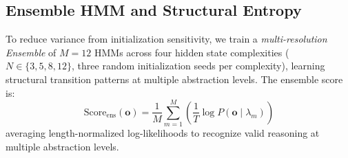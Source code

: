 \documentclass[conference]{IEEEtran}
\begin{document}
\begin{table}[htbp]
\caption{Semantic Tag Vocabulary and Lexical / Pattern Cues}
\label{tab:tags}
\begin{center}
\end{center}
\end{table}

\subsection{Ensemble HMM and Structural Entropy}

To reduce variance from initialization sensitivity, we train a \textit{multi-resolution Ensemble} of $M=12$ HMMs across four hidden state complexities ($N \in \{3, 5, 8, 12\}$, three random initialization seeds per complexity), learning structural transition patterns at multiple abstraction levels. The ensemble score is:
\begin{equation}
\text{Score}_{\text{ens}}(\mathbf{o}) = \frac{1}{M} \sum_{m=1}^{M} \left( \frac{1}{T} \log P(\mathbf{o} \mid \lambda_m) \right)
\label{eq:ensemble_score}
\end{equation}
averaging length-normalized log-likelihoods to recognize valid reasoning at multiple abstraction levels.
\end{document}
